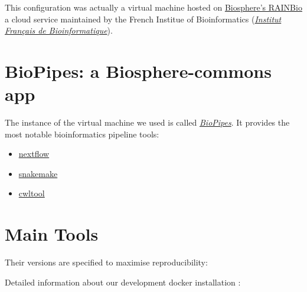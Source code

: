 \documentclass[
  openany]{book}
\newenvironment{Shaded}{\begin{snugshade}}{\end{snugshade}}
\newcommand{\AttributeTok}[1]{\textcolor[rgb]{0.77,0.63,0.00}{#1}}
\newcommand{\ExtensionTok}[1]{#1}
\newcommand{\NormalTok}[1]{#1}
\providecommand{\tightlist}{%
  \setlength{\itemsep}{0pt}\setlength{\parskip}{0pt}}
\begin{document}
This configuration was actually a virtual machine hosted on \href{https://biosphere.france-bioinformatique.fr/catalogue/}{Biosphere's RAINBio} a cloud service maintained by the French Institue of Bioinformatics (\href{https://www.france-bioinformatique.fr/en/home/}{\emph{Institut Français de Bioinformatique}}).

\hypertarget{biopipes-a-biosphere-commons-app}{%
\section{BioPipes: a Biosphere-commons app}\label{biopipes-a-biosphere-commons-app}}

The instance of the virtual machine we used is called \href{https://biosphere.france-bioinformatique.fr/catalogue/appliance/119/}{\emph{BioPipes}}. It provides the most notable bioinformatics pipeline tools:

\begin{itemize}
\tightlist
\item
  \href{https://www.nextflow.io/}{nextflow}
\item
  \href{https://snakemake.github.io/}{snakemake}
\item
  \href{https://www.commonwl.org/}{cwltool}
\end{itemize}

\hypertarget{main-tools}{%
\section{Main Tools}\label{main-tools}}

Their versions are specified to maximise reproducibility:

\begin{Shaded}
\end{Shaded}

Detailed information about our development docker installation :
\end{document}
